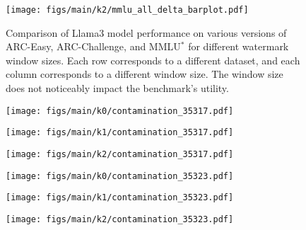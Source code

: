 \begin{figure}[b!]
    \begin{minipage}{0.32\textwidth}
        \centering
        \texttt{[image: figs/main/k2/mmlu\_all\_delta\_barplot.pdf]}
    \end{minipage}
    \vspace{-0.3cm}
    \caption{
Comparison of Llama3 model performance on various versions of ARC-Easy, ARC-Challenge, and MMLU$^*$ for different watermark window sizes.
Each row corresponds to a different dataset, and each column corresponds to a different window size.
The window size does not noticeably impact the benchmark's utility.}
    \label{fig:appendix_watermark_performance}
\end{figure}


\begin{figure}[t]
    \centering
    \begin{minipage}{0.32\textwidth}
        \centering
        \texttt{[image: figs/main/k0/contamination\_35317.pdf]}
    \end{minipage}\hfill
    \begin{minipage}{0.32\textwidth}
        \centering
        \texttt{[image: figs/main/k1/contamination\_35317.pdf]}
    \end{minipage}\hfill
    \begin{minipage}{0.32\textwidth}
        \centering
        \texttt{[image: figs/main/k2/contamination\_35317.pdf]}
    \end{minipage}
    \vspace{0.5cm} %
    \begin{minipage}{0.32\textwidth}
        \centering
        \texttt{[image: figs/main/k0/contamination\_35323.pdf]}
    \end{minipage}\hfill
    \begin{minipage}{0.32\textwidth}
        \centering
        \texttt{[image: figs/main/k1/contamination\_35323.pdf]}
    \end{minipage}\hfill
    \begin{minipage}{0.32\textwidth}
        \centering
        \texttt{[image: figs/main/k2/contamination\_35323.pdf]}

\end{minipage}
\end{figure}
